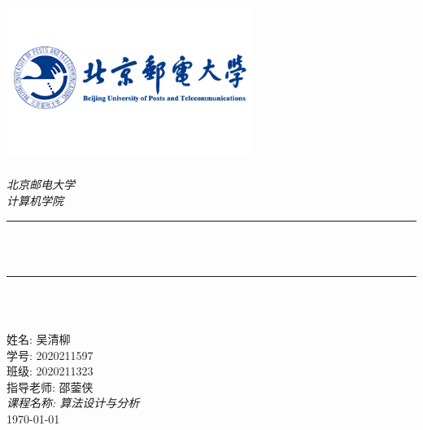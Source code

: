 \begin{titlepage}
	\newcommand{\HRule}{\rule{\linewidth}{0.5mm}}
	\includegraphics[width=8cm]{title/logo_bupt.png}\\[1cm]
	\center
	\quad\\[1.5cm]
	\textsl{\Large 北京邮电大学}\\[0.5cm]
	\textsl{\large  计算机学院}\\[0.5cm]
	\makeatletter
	\HRule \\[0.4cm]
	{\huge \bfseries \@title}\\[0.4cm]
	\HRule \\[0.5cm]
	\begin{minipage}{0.4\textwidth}
	\end{minipage}
	~\\[1cm] %

	\makeatother
	{\large 姓名: 吴清柳}\\[0.5cm]
	{\large 学号: 2020211597}\\[0.5cm]
	{\large 班级: 2020211323}\\[0.5cm]
	{\large 指导老师: 邵蓥侠}\\[0.5cm]
	{\large \emph{课程名称: 算法设计与分析}}\\[0.5cm]
	{\large \today}\\[2cm]
	\vfill
\end{titlepage}
